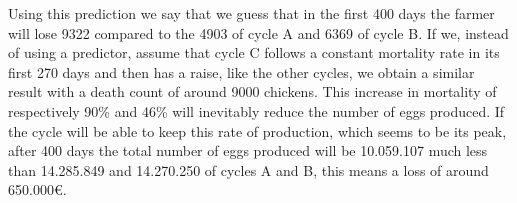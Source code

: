 \documentclass[11pt]{article}
\begin{document}
Using this prediction we say that we guess that in the first 400 days the farmer will lose 9322 compared to the 4903 of cycle A and 6369 of cycle B.
If we, instead of using a predictor, assume that cycle C follows a constant mortality rate in its first 270 days and then has a raise, like the other cycles, we obtain a similar result with a death count of around 9000 chickens. 
This increase in mortality of respectively 90\% and 46\% will inevitably reduce the number of eggs produced.
If the cycle will be able to keep this rate of production, which seems to be its peak, after 400 days the total number of eggs produced will be 10.059.107 much less than 14.285.849 and 14.270.250 of cycles A and B, this means a loss of around 650.000\euro.
\end{document}
